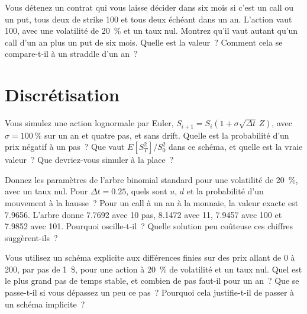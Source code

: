 \begin{question}\label{iq:iv2:pricing-and-numerics:24}
Vous détenez un contrat qui vous laisse décider dans six mois si c'est un call ou un put, tous deux de strike 100 et tous deux échéant dans un an. L'action vaut 100, avec une volatilité de 20~\% et un taux nul. Montrez qu'il vaut autant qu'un call d'un an plus un put de six mois. Quelle est la valeur~? Comment cela se compare-t-il à un straddle d'un an~?
\end{question}

\section{Discrétisation}

\begin{question}\label{iq:iv2:pricing-and-numerics:25}
Vous simulez une action lognormale par Euler, $S_{i+1} = S_i(1 + \sigma\sqrt{\Delta t}\,Z)$, avec $\sigma = 100~\%$ sur un an et quatre pas, et sans drift. Quelle est la probabilité d'un prix négatif à un pas~? Que vaut $E[S_T^2]/S_0^2$ dans ce schéma, et quelle est la vraie valeur~? Que devriez-vous simuler à la place~?
\end{question}

\begin{question}\label{iq:iv2:pricing-and-numerics:26}
Donnez les paramètres de l'arbre binomial standard pour une volatilité de 20~\%, avec un taux nul. Pour $\Delta t = 0.25$, quels sont $u$, $d$ et la probabilité d'un mouvement à la hausse~? Pour un call à un an à la monnaie, la valeur exacte est 7.9656. L'arbre donne 7.7692 avec 10 pas, 8.1472 avec 11, 7.9457 avec 100 et 7.9852 avec 101. Pourquoi oscille-t-il~? Quelle solution peu coûteuse ces chiffres suggèrent-ils~?
\end{question}

\begin{question}\label{iq:iv2:pricing-and-numerics:27}
Vous utilisez un schéma explicite aux différences finies sur des prix allant de 0 à 200, par pas de 1~\$, pour une action à 20~\% de volatilité et un taux nul. Quel est le plus grand pas de temps stable, et combien de pas faut-il pour un an~? Que se passe-t-il si vous dépassez un peu ce pas~? Pourquoi cela justifie-t-il de passer à un schéma implicite~?
\end{question}

